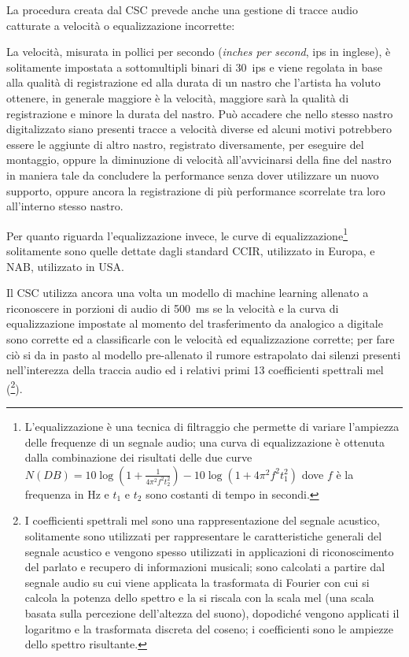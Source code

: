 La procedura creata dal \ac{CSC} prevede anche una gestione di tracce audio catturate a velocità o equalizzazione incorrette:

La velocità, misurata in pollici per secondo (\textit{inches per second}, ips in inglese), è solitamente impostata a sottomultipli binari di \qty{30}{ips} e viene regolata in base alla qualità di registrazione ed alla durata di un nastro che l'artista ha voluto ottenere, in generale maggiore è la velocità, maggiore sarà la qualità di registrazione e minore la durata del nastro.
Può accadere che nello stesso nastro digitalizzato siano presenti tracce a velocità diverse ed alcuni motivi potrebbero essere le aggiunte di altro nastro, registrato diversamente, per eseguire del montaggio, oppure la diminuzione di velocità all'avvicinarsi della fine del nastro in maniera tale da concludere la performance senza dover utilizzare un nuovo supporto, oppure ancora la registrazione di più performance scorrelate tra loro all'interno stesso nastro.

Per quanto riguarda l'equalizzazione invece, le curve di equalizzazione\footnote{L'equalizzazione è una tecnica di filtraggio che permette di variare l'ampiezza delle frequenze di un segnale audio; una curva di equalizzazione è ottenuta dalla combinazione dei risultati delle due curve $N(DB)=10 \log(1 + \frac{1}{4 \pi^2 f^2 t_2^2}) - 10 \log(1+4\pi^2 f^2 t_1^2)$ dove $f$ è la frequenza in \unit{\Hz} e $t_1$ e $t_2$ sono costanti di tempo in secondi.} solitamente sono quelle dettate dagli standard \acs{CCIR}, utilizzato in Europa, e \acs{NAB}, utilizzato in USA.

Il CSC utilizza ancora una volta un modello di machine learning allenato a riconoscere in porzioni di audio di \qty{500}{\ms} se la velocità e la curva di equalizzazione impostate al momento del trasferimento da analogico a digitale sono corrette ed a classificarle con le velocità ed equalizzazione corrette; per fare ciò si da in pasto al modello pre-allenato il rumore estrapolato dai silenzi presenti nell'interezza della traccia audio ed i relativi primi 13 coefficienti spettrali mel (\footnote{I coefficienti spettrali mel sono una rappresentazione del segnale acustico, solitamente sono utilizzati per rappresentare le caratteristiche generali del segnale acustico e vengono spesso utilizzati in applicazioni di riconoscimento del parlato e recupero di informazioni musicali; sono calcolati a partire dal segnale audio su cui viene applicata la trasformata di Fourier con cui si calcola la potenza dello spettro e la si riscala con la scala mel (una scala basata sulla percezione dell'altezza del suono), dopodiché vengono applicati il logaritmo e la trasformata discreta del coseno; i coefficienti sono le ampiezze dello spettro risultante.}).
